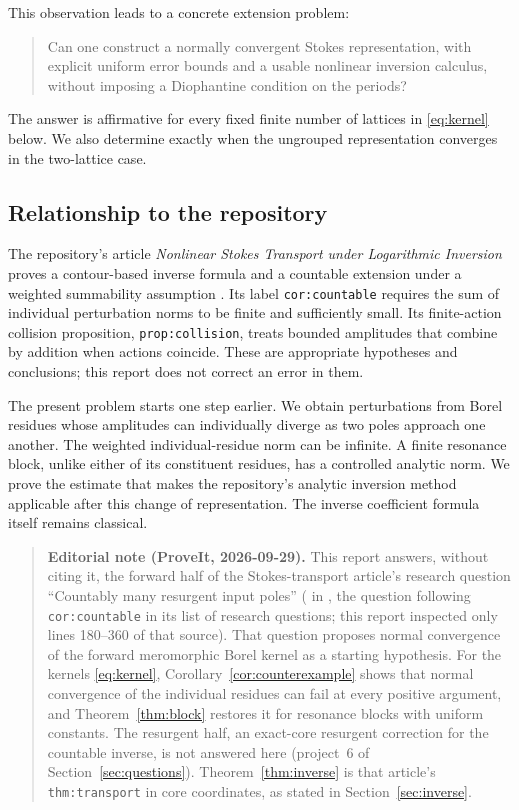 \documentclass[11pt,a4paper]{article}
\numberwithin{equation}{section}
\theoremstyle{definition}
\theoremstyle{remark}
\begin{document}
This observation leads to a concrete extension problem:
\begin{quote}
Can one construct a normally convergent Stokes representation, with
explicit uniform error bounds and a usable nonlinear inversion calculus,
without imposing a Diophantine condition on the periods?
\end{quote}
The answer is affirmative for every fixed finite number of lattices in
\eqref{eq:kernel} below. We also determine exactly when the ungrouped
representation converges in the two-lattice case.

\subsection{Relationship to the repository}
The repository's article \emph{Nonlinear Stokes Transport under Logarithmic
Inversion} proves a contour-based inverse formula and a countable extension
under a weighted summability assumption
\cite{repo-stokes}. Its label \texttt{cor:countable} requires the sum of
individual perturbation norms to be finite and sufficiently small. Its
finite-action collision proposition, \texttt{prop:collision}, treats
bounded amplitudes that combine by addition when actions coincide. These
are appropriate hypotheses and conclusions; this report does not correct
an error in them.

The present problem starts one step earlier. We obtain perturbations from
Borel residues whose amplitudes can individually diverge as two poles
approach one another. The weighted individual-residue norm can be infinite.
A finite resonance block, unlike either of its constituent residues, has
a controlled analytic norm. We prove the estimate that makes the
repository's analytic inversion method applicable after this change of
representation. The inverse coefficient formula itself remains classical.

\begin{quote}\small\textbf{Editorial note (ProveIt, 2026-09-29).} This report answers, without citing it, the forward half of the Stokes-transport article's research question ``Countably many resurgent input poles'' ( in , the question following \texttt{cor:countable} in its list of research questions; this report inspected only lines 180--360 of that source). That question proposes normal convergence of the forward meromorphic Borel kernel as a starting hypothesis. For the kernels \eqref{eq:kernel}, Corollary~\ref{cor:counterexample} shows that normal convergence of the individual residues can fail at every positive argument, and Theorem~\ref{thm:block} restores it for resonance blocks with uniform constants. The resurgent half, an exact-core resurgent correction for the countable inverse, is not answered here (project~6 of Section~\ref{sec:questions}). Theorem~\ref{thm:inverse} is that article's \texttt{thm:transport} in core coordinates, as stated in Section~\ref{sec:inverse}.\end{quote}
\end{document}
